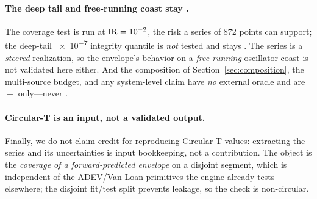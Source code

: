 \paragraph{The deep tail and free-running coast stay \Modelled{}.}
The coverage test is run at $\mathrm{IR}=\num{e-2}$, the risk a series of 872 points can
support; the deep-tail \num{e-7} integrity quantile is \emph{not} tested and stays
\Modelled{}. The series is a \emph{steered} realization, so the envelope's behavior
on a \emph{free-running} oscillator coast is not validated here either. And the
composition of Section~\ref{sec:composition}, the multi-source budget, and any
system-level claim have \emph{no} external oracle and are \Proven{}${}+{}$\Modelled{}
only---never \Validated{}.

\paragraph{Circular-T is an input, not a validated output.}
Finally, we do not claim credit for reproducing Circular-T values: extracting the
series and its uncertainties \citep{bipmcirculart,defraigne2015,panfilo2019} is
input bookkeeping, not a contribution. The \Validated{} object is the
\emph{coverage of a forward-predicted envelope} on a disjoint segment, which is
independent of the ADEV/Van-Loan primitives the engine already tests
elsewhere; the disjoint fit/test split prevents leakage, so the check is
non-circular.
